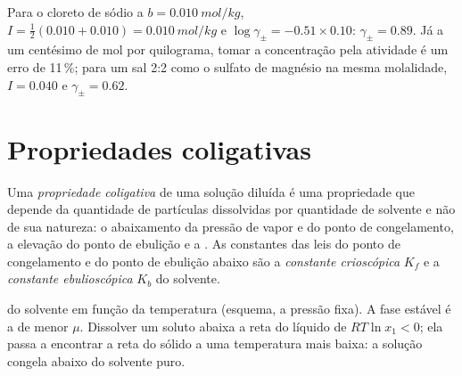 \begin{example}\label{ex:b2:chemical-potential:dh}
Para o cloreto de sódio a $b = \qty{0.010}{mol/kg}$, $I = \frac12(0.010 + 0.010)
= \qty{0.010}{mol/kg}$ e $\log\gamma_\pm = -0.51 \times 0.10$: $\gamma_\pm
= 0.89$. Já a um centésimo de mol por quilograma, tomar a concentração pela
atividade é um erro de 11\,\%; para um sal 2:2 como o sulfato de magnésio
na mesma molalidade, $I = 0.040$ e $\gamma_\pm = 0.62$.
\end{example}

\section{Propriedades coligativas}

\begin{definition}\label{def:b2:chemical-potential:colligative}
Uma \emph{propriedade coligativa} de uma solução
diluída é uma propriedade que depende da quantidade de partículas
dissolvidas por quantidade de solvente e não de sua natureza: o abaixamento
da pressão de vapor e do ponto de congelamento, a elevação do ponto de
ebulição e a . As constantes das leis do ponto de
congelamento e do ponto de ebulição abaixo são a \emph{constante
crioscópica} $K_f$
e a \emph{constante ebulioscópica} $K_b$ do
solvente.
\end{definition}

\begin{omfigure}

{\small {} do solvente em função da temperatura (esquema, a
pressão fixa). A fase estável é a de menor $\mu$. Dissolver um soluto abaixa
a reta do líquido de $RT\ln x_1 < 0$; ela passa a encontrar a reta do sólido
a uma temperatura mais baixa: a solução congela abaixo do solvente puro.}
\end{omfigure}

